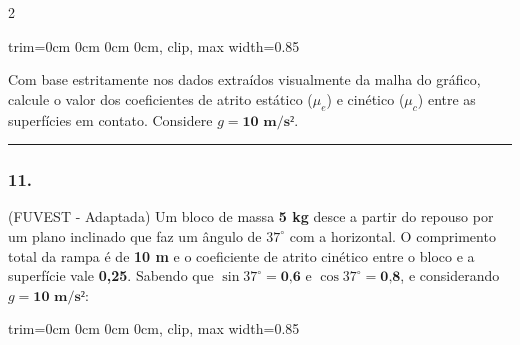 \documentclass[twoside, 10pt, a4paper]{article}
\newlength{\espacoPreQuestao}\setlength{\espacoPreQuestao}{0.1cm}
\newlength{\espacoQuestao}\setlength{\espacoQuestao}{0.2cm}
\newcommand{\larguraTikz}{0.85\linewidth}
\begin{document}
\begin{multicols*}{2}
\begin{center}
\begin{adjustbox}{trim=0cm 0cm 0cm 0cm, clip, max width=\larguraTikz}
\end{adjustbox}
\end{center}

Com base estritamente nos dados extraídos visualmente da malha do gráfico, calcule o valor dos coeficientes de atrito estático ($\mu_e$) e cinético ($\mu_c$) entre as superfícies em contato. Considere $g = \textbf{10 m/s²}$.
\par\vspace{\espacoQuestao}
\noindent\textcolor{CorLinha}{\rule{\linewidth}{0.5pt}} 
\par\vspace{\espacoPreQuestao}
\subsubsection*{11.} (FUVEST - Adaptada) Um bloco de massa \textbf{5 kg} desce a partir do repouso por um plano inclinado que faz um ângulo de $37^\circ$ com a horizontal. O comprimento total da rampa é de \textbf{10 m} e o coeficiente de atrito cinético entre o bloco e a superfície vale \textbf{0,25}. Sabendo que $\sin 37^\circ = \textbf{0,6}$ e $\cos 37^\circ = \textbf{0,8}$, e considerando $g = \textbf{10 m/s²}$:

\begin{center}
\begin{adjustbox}{trim=0cm 0cm 0cm 0cm, clip, max width=\larguraTikz}
\end{adjustbox}
\end{center}
\end{multicols*}
\end{document}
